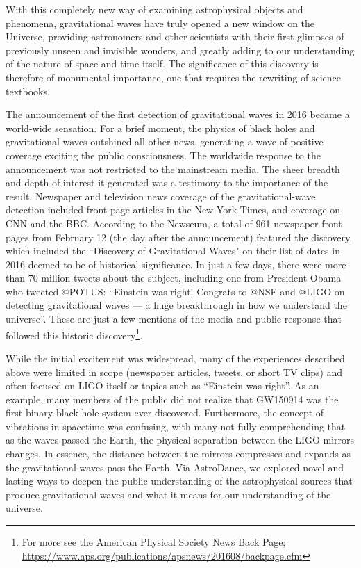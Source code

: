 \documentclass[11.5pt]{sig-alternate} %
\begin{document}
\begin{large}
With this completely new way of examining astrophysical objects and phenomena, gravitational waves have truly opened a new window on the Universe, providing astronomers and other scientists with their first glimpses of previously unseen and invisible wonders, and greatly adding to our understanding of the nature of space and time itself. The significance of this discovery is therefore of monumental importance, one that requires the rewriting of science 
textbooks.

The announcement of the first detection of gravitational waves in 2016 became a world-wide sensation.  For a brief moment, the physics of black holes and gravitational waves outshined all other news, generating a wave of positive coverage exciting the public consciousness.  The worldwide response to the announcement was not restricted to the mainstream media.  The sheer breadth and depth of interest it generated was a testimony to the importance of the result.  Newspaper and television news coverage of the gravitational-wave detection included front-page articles in the New York Times, and coverage on CNN and the BBC. According to the Newseum, a total of 961 newspaper front pages from February 12 (the day after the announcement) featured the discovery, which included the ``Discovery of Gravitational Waves" on their list of dates in 2016 deemed to be of historical significance.  In just a few days, there were more than 70 million tweets about the subject, including one from President Obama who tweeted @POTUS: ``Einstein was right! Congrats to @NSF and @LIGO on detecting gravitational waves — a huge breakthrough in how we understand the universe”.  These are just a few mentions of the media and public response that followed this historic discovery\footnote{For more see the American Physical Society News Back Page; \url{https://www.aps.org/publications/apsnews/201608/backpage.cfm}}.

While the initial excitement was widespread, many of the experiences described above were limited in scope (newspaper articles, tweets, or short TV clips) and often focused on LIGO itself or topics such as “Einstein was right”.  As an example, many members of the public did not realize that GW150914 was the first binary-black hole system ever discovered.  Furthermore, the concept of vibrations in spacetime was confusing, with many not fully comprehending that as the waves passed the Earth, the physical separation between the LIGO mirrors changes.  In essence, the distance between the mirrors compresses and expands as the gravitational waves pass the Earth.  Via AstroDance, we explored novel and lasting ways to deepen the public understanding of the astrophysical sources that produce gravitational waves and what it means for our understanding of the universe.


\end{large}
\end{document}
